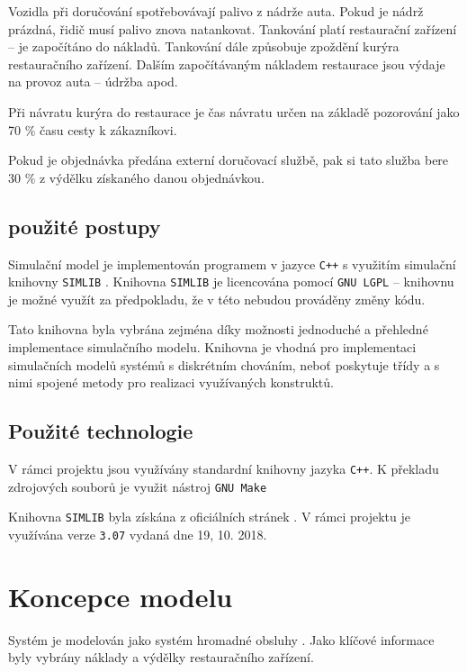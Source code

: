 \documentclass[a4paper, 11pt]{article}
\begin{document}
Vozidla při doručování spotřebovávají palivo z nádrže auta. Pokud je nádrž prázdná, řidič musí palivo znova natankovat. Tankování platí restaurační zařízení -- je započítáno do nákladů. Tankování dále způsobuje zpoždění kurýra restauračního zařízení. Dalším započítávaným nákladem restaurace jsou výdaje na provoz auta -- údržba apod. 

Při návratu kurýra do restaurace je čas návratu určen na základě pozorování jako 70 \% času cesty k zákazníkovi. 

Pokud je objednávka předána externí doručovací službě, pak si tato služba bere 30 \% z výdělku \cite{news} získaného danou objednávkou. 

\subsection{použité postupy}
Simulační model \cite[snímek 9]{IMS_course} je implementován programem v jazyce \texttt{C++} s využitím simulační knihovny \texttt{SIMLIB} \cite{SIMLIB}.
Knihovna \texttt{SIMLIB} je licencována pomocí \texttt{GNU LGPL} -- knihovnu je možné využít za předpokladu, že v této nebudou prováděny změny kódu.

Tato knihovna byla vybrána zejména díky možnosti jednoduché a přehledné implementace simulačního modelu. Knihovna je vhodná pro implementaci simulačních modelů systémů \cite[snímek 18]{IMS_course} s diskrétním chováním\cite[snímek 31]{IMS_course}, neboť poskytuje třídy a s nimi spojené metody pro realizaci využívaných konstruktů.

\subsection{Použité technologie}
V rámci projektu jsou využívány standardní knihovny jazyka \texttt{C++}. K překladu zdrojových souborů je využit nástroj \texttt{GNU Make}

Knihovna \texttt{SIMLIB} byla získána z oficiálních stránek \cite{SIMLIB}. V rámci projektu je využívána verze \texttt{3.07} vydaná dne 19, 10. 2018.

\section{Koncepce modelu}
Systém je modelován jako systém hromadné obsluhy \cite[snímek 136]{IMS_course}. Jako klíčové informace byly vybrány náklady a výdělky restauračního zařízení. 
\end{document}
